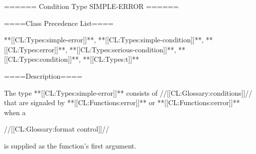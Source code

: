 ====== Condition Type SIMPLE-ERROR ======

====Class Precedence List====

**[[CL:Types:simple-error]]**, **[[CL:Types:simple-condition]]**, **[[CL:Types:error]]**, **[[CL:Types:serious-condition]]**, **[[CL:Types:condition]]**, **[[CL:Types:t]]**

====Description====

The type **[[CL:Types:simple-error]]** consists of //[[CL:Glossary:conditions]]// that are signaled by **[[CL:Functions:error]]** or **[[CL:Functions:cerror]]** when a

//[[CL:Glossary:format control]]//

is supplied as the function's first argument.

 
